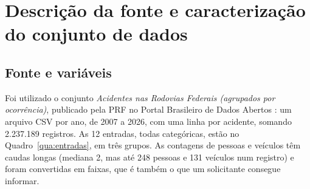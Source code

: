 \chapter{Descrição da fonte e caracterização do conjunto de dados}
\label{cap:dados}

\section{Fonte e variáveis}
\label{sec:entradas}

Foi utilizado o conjunto \textit{Acidentes nas Rodovias Federais (agrupados por ocorrência)}, publicado pela PRF no Portal Brasileiro de Dados Abertos \cite{prf2026}: um arquivo CSV por ano, de 2007 a 2026, com uma linha por acidente, somando 2.237.189 registros. As 12 entradas, todas categóricas, estão no Quadro~\ref{qua:entradas}, em três grupos. As contagens de pessoas e veículos têm caudas longas (mediana 2, mas até 248 pessoas e 131 veículos num registro) e foram convertidas em faixas, que é também o que um solicitante consegue informar.

